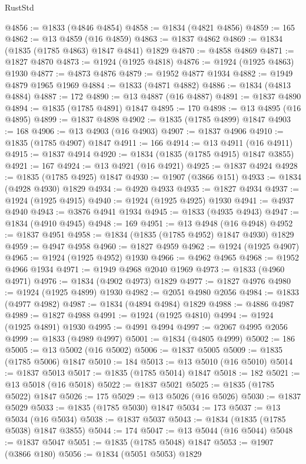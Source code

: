 \begin{lexlean}{RustStd}
\begin{coremodule}
{\begin{coremodule}
{{{{{@4856 := @1833 (@4846 @4854)
@4858 := @1834 (@4821 @4856)
@4859 := 165
@4862 := @13 @4859 (@16 @4859)
@4863 := @1837 @4862
@4869 := @1834 (@1835 (@1785 @4863) @1847 @4841) @1829
@4870 := @4858 @4869
@4871 := @1827 @4870
@4873 := @1924 (@1925 @4818)
@4876 := @1924 (@1925 @4863) @1930
@4877 := @4873 @4876
@4879 := @1952 @4877 @1934
@4882 := @1949 @4879 @1965 @1969
@4884 := @1833 (@4871 @4882)
@4886 := @1834 (@4813 @4884)
@4887 := 172
@4890 := @13 @4887 (@16 @4887)
@4891 := @1837 @4890
@4894 := @1835 (@1785 @4891) @1847
@4895 := 170
@4898 := @13 @4895 (@16 @4895)
@4899 := @1837 @4898
@4902 := @1835 (@1785 @4899) @1847
@4903 := 168
@4906 := @13 @4903 (@16 @4903)
@4907 := @1837 @4906
@4910 := @1835 (@1785 @4907) @1847
@4911 := 166
@4914 := @13 @4911 (@16 @4911)
@4915 := @1837 @4914
@4920 := @1834 (@1835 (@1785 @4915) @1847 @3855)
@4921 := 167
@4924 := @13 @4921 (@16 @4921)
@4925 := @1837 @4924
@4928 := @1835 (@1785 @4925) @1847
@4930 := @1907 (@3866 @151)
@4933 := @1834 (@4928 @4930) @1829
@4934 := @4920 @4933
@4935 := @1827 @4934
@4937 := @1924 (@1925 @4915)
@4940 := @1924 (@1925 @4925) @1930
@4941 := @4937 @4940
@4943 := @3876 @4941 @1934
@4945 := @1833 (@4935 @4943)
@4947 := @1834 (@4910 @4945)
@4948 := 169
@4951 := @13 @4948 (@16 @4948)
@4952 := @1837 @4951
@4958 := @1834 (@1835 (@1785 @4952) @1847 @4930) @1829
@4959 := @4947 @4958
@4960 := @1827 @4959
@4962 := @1924 (@1925 @4907)
@4965 := @1924 (@1925 @4952) @1930
@4966 := @4962 @4965
@4968 := @1952 @4966 @1934
@4971 := @1949 @4968 @2040 @1969
@4973 := @1833 (@4960 @4971)
@4976 := @1834 (@4902 @4973) @1829
@4977 := @1827 @4976
@4980 := @1924 (@1925 @4899) @1930
@4982 := @2051 @4980 @2056
@4984 := @1833 (@4977 @4982)
@4987 := @1834 (@4894 @4984) @1829
@4988 := @4886 @4987
@4989 := @1827 @4988
@4991 := @1924 (@1925 @4810)
@4994 := @1924 (@1925 @4891) @1930
@4995 := @4991 @4994
@4997 := @2067 @4995 @2056
@4999 := @1833 (@4989 @4997)
@5001 := @1834 (@4805 @4999)
@5002 := 186
@5005 := @13 @5002 (@16 @5002)
@5006 := @1837 @5005
@5009 := @1835 (@1785 @5006) @1847
@5010 := 184
@5013 := @13 @5010 (@16 @5010)
@5014 := @1837 @5013
@5017 := @1835 (@1785 @5014) @1847
@5018 := 182
@5021 := @13 @5018 (@16 @5018)
@5022 := @1837 @5021
@5025 := @1835 (@1785 @5022) @1847
@5026 := 175
@5029 := @13 @5026 (@16 @5026)
@5030 := @1837 @5029
@5033 := @1835 (@1785 @5030) @1847
@5034 := 173
@5037 := @13 @5034 (@16 @5034)
@5038 := @1837 @5037
@5043 := @1834 (@1835 (@1785 @5038) @1847 @3855)
@5044 := 174
@5047 := @13 @5044 (@16 @5044)
@5048 := @1837 @5047
@5051 := @1835 (@1785 @5048) @1847
@5053 := @1907 (@3866 @180)
@5056 := @1834 (@5051 @5053) @1829
}}}}}
\end{coremodule}}
\end{coremodule}
\end{lexlean}
